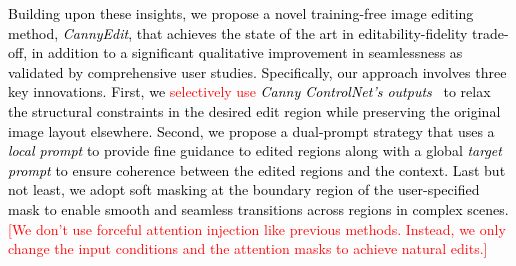 \documentclass{article}
\newcommand{\kcc}[1]{\textcolor{black}{#1}}
\begin{document}







\kcc{Building upon these insights, we propose a novel training-free image editing method, \emph{CannyEdit}, that achieves the state of the art in editability-fidelity trade-off, in addition to a significant qualitative improvement in seamlessness as validated by comprehensive user studies.
Specifically, our approach involves three key innovations.
First, we \textcolor{red}{selectively use} \emph{Canny ControlNet's outputs}~\citep{zhang2023adding} to relax the structural constraints in the desired edit region while preserving the original image layout elsewhere.
Second, we propose a dual-prompt strategy that uses a \emph{local prompt} to provide fine guidance to edited regions along with a global \emph{target prompt} to ensure coherence between the edited regions and the context.
Last but not least, we adopt soft masking at the boundary region of the user-specified mask to enable smooth and seamless transitions across regions in complex scenes. \textcolor{red}{[We don't use forceful attention injection like previous methods. Instead, we only change the input conditions and the attention masks to achieve natural edits.]}}
\end{document}
